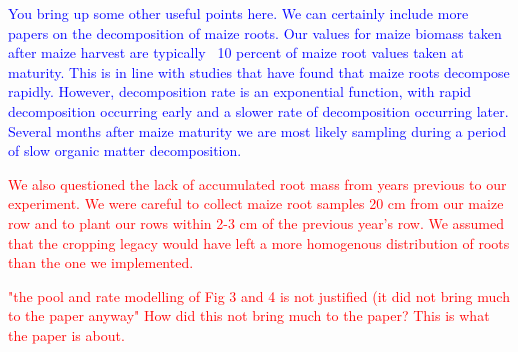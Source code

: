 \documentclass[]{article}
\begin{document}
\textcolor{blue}{You bring up some other useful points here. We can certainly include more papers on the decomposition of maize roots. Our values for maize biomass taken after maize harvest are typically ~10 percent of maize root values taken at maturity. This is in line with studies that have found that maize roots decompose rapidly. However, decomposition rate is an exponential function, with rapid decomposition occurring early and a slower rate of decomposition occurring later. Several months after maize maturity we are most likely sampling during a period of slow organic matter decomposition.}

\textcolor{red}{We also questioned the lack of accumulated root mass from years previous to our experiment. We were careful to collect maize root samples 20 cm from our maize row and to plant our rows within 2-3 cm of the previous year's row. We assumed that the cropping legacy would have left a more homogenous distribution of roots than the one we implemented.}

\textcolor{red}{"the pool and rate modelling of Fig 3 and 4 is not justified (it did not bring much to the paper anyway" How did this not bring much to the paper? This is what the paper is about.}
\end{document}
